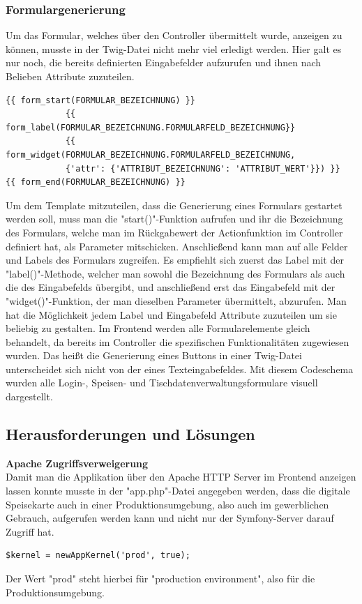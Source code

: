     \subsubsection{Formulargenerierung}

Um das Formular, welches über den Controller übermittelt wurde, anzeigen zu können, musste in der Twig-Datei nicht mehr viel erledigt werden. Hier galt es nur noch, die bereits definierten Eingabefelder aufzurufen und ihnen nach Belieben Attribute zuzuteilen.
\lstset{language = java}
  	\begin{lstlisting}
{{ form_start(FORMULAR_BEZEICHNUNG) }}
            {{ form_label(FORMULAR_BEZEICHNUNG.FORMULARFELD_BEZEICHNUNG}}
            {{ form_widget(FORMULAR_BEZEICHNUNG.FORMULARFELD_BEZEICHNUNG, 
            {'attr': {'ATTRIBUT_BEZEICHNUNG': 'ATTRIBUT_WERT'}}) }}
{{ form_end(FORMULAR_BEZEICHNUNG) }}
	\end{lstlisting}
Um dem Template mitzuteilen, dass die Generierung eines Formulars gestartet werden soll, muss man die "start()"-Funktion aufrufen und ihr die Bezeichnung des Formulars, welche man im Rückgabewert der Actionfunktion im Controller definiert hat, als Parameter mitschicken. 
Anschließend kann man auf alle Felder und Labels des Formulars zugreifen. Es empfiehlt sich zuerst das Label mit der "label()"-Methode, welcher man sowohl die Bezeichnung des Formulars als auch die des Eingabefelds übergibt, und anschließend erst das Eingabefeld mit der "widget()"-Funktion, der man dieselben Parameter übermittelt, abzurufen. Man hat die Möglichkeit jedem Label und Eingabefeld Attribute zuzuteilen um sie beliebig zu gestalten. Im Frontend werden alle Formularelemente gleich behandelt, da bereits im Controller die spezifischen Funktionalitäten zugewiesen wurden. Das heißt die Generierung eines Buttons in einer Twig-Datei unterscheidet sich nicht von der eines Texteingabefeldes.
Mit diesem Codeschema wurden alle Login-, Speisen- und Tischdatenverwaltungsformulare visuell dargestellt.

  \subsection{Herausforderungen und Lösungen}

\textbf{Apache Zugriffsverweigerung}\\ 
Damit man die Applikation über den Apache HTTP Server im Frontend anzeigen lassen konnte musste in der "app.php"-Datei angegeben werden, dass die digitale Speisekarte auch in einer Produktionsumgebung, also auch im gewerblichen Gebrauch, aufgerufen werden kann und nicht nur der Symfony-Server darauf Zugriff hat.
	\lstset{language=php}
  	\begin{lstlisting}
$kernel = newAppKernel('prod', true);
  	\end{lstlisting}
Der Wert "prod" steht hierbei für "production environment", also für die Produktionsumgebung.

